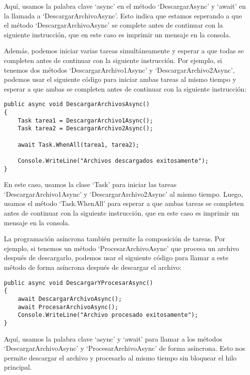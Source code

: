 \documentclass[executivepaper]{article}
\begin{document}
Aquí, usamos la palabra clave \enquote*{async} en el método \enquote*{DescargarAsync} y \enquote*{await} en la llamada a \enquote*{DescargarArchivoAsync}. Esto indica que estamos esperando a que el método \enquote*{DescargarArchivoAsync} se complete antes de continuar con la siguiente instrucción, que en este caso es imprimir un mensaje en la consola.

Además, podemos iniciar varias tareas simultáneamente y esperar a que todas se completen antes de continuar con la siguiente instrucción. Por ejemplo, si tenemos dos métodos \enquote*{DescargarArchivo1Async} y \enquote*{DescargarArchivo2Async}, podemos usar el siguiente código para iniciar ambas tareas al mismo tiempo y esperar a que ambas se completen antes de continuar con la siguiente instrucción:

\begin{lstlisting}
public async void DescargarArchivosAsync()
{
    Task tarea1 = DescargarArchivo1Async();
    Task tarea2 = DescargarArchivo2Async();
    
    await Task.WhenAll(tarea1, tarea2);
    
    Console.WriteLine("Archivos descargados exitosamente");
}   
\end{lstlisting}

En este caso, usamos la clase \enquote*{Task} para iniciar las tareas \enquote*{DescargarArchivo1Async} y \enquote*{DescargarArchivo2Async} al mismo tiempo. Luego, usamos el método \enquote*{Task.WhenAll} para esperar a que ambas tareas se completen antes de continuar con la siguiente instrucción, que en este caso es imprimir un mensaje en la consola.

La programación asíncrona también permite la composición de tareas. Por ejemplo, si tenemos un método \enquote*{ProcesarArchivoAsync} que procesa un archivo después de descargarlo, podemos usar el siguiente código para llamar a este método de forma asíncrona después de descargar el archivo:

\begin{lstlisting}
public async void DescargarYProcesarAsync()
{
    await DescargarArchivoAsync();
    await ProcesarArchivoAsync();
    Console.WriteLine("Archivo procesado exitosamente");
}
\end{lstlisting}

Aquí, usamos la palabra clave \enquote*{async} y \enquote*{await} para llamar a los métodos \enquote*{DescargarArchivoAsync} y \enquote*{ProcesarArchivoAsync} de forma asíncrona. Esto nos permite descargar el archivo y procesarlo al mismo tiempo sin bloquear el hilo principal.
\end{document}
